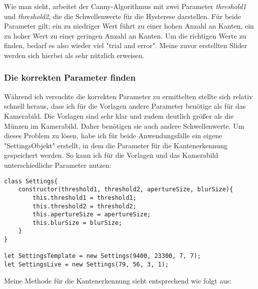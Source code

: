 Wie man sieht, arbeitet der Canny-Algorithmus mit zwei Parameter \textit{threshold1} und \textit{threshold2}, die die Schwellenwerte für die Hysterese darstellen. Für beide Parameter gilt: ein zu niedriger Wert führt zu einer hohen Anzahl an Kanten, ein zu hoher Wert zu einer geringen Anzahl an Kanten. Um die richtigen Werte zu finden, bedarf es also wieder viel "trial and error". Meine zuvor erstellten Slider werden sich hierbei als sehr nützlich erweisen.
\subsubsection{Die korrekten Parameter finden}
Während ich versuchte die korrekten Parameter zu ermittelten stellte sich relativ schnell heraus, dass ich für die Vorlagen andere Parameter benötige als für das Kamerabild. Die Vorlagen sind sehr klar und zudem deutlich größer als die Münzen im Kamerabild. Daher benötigen sie auch andere Schwellenwerte. Um dieses Problem zu lösen, habe ich für beide Anwendungsfälle ein eigene "SettingsObjekt" erstellt, in dem die Parameter für die Kantenerkennung gespeichert werden. So kann ich für die Vorlagen und das Kamerabild unterschiedliche Parameter nutzen:

\begin{lstlisting}[style=JavaScript]
class Settings{
    constructor(threshold1, threshold2, apertureSize, blurSize){
        this.threshold1 = threshold1;
        this.threshold2 = threshold2;
        this.apertureSize = apertureSize;
        this.blurSize = blurSize;
    }
}

let SettingsTemplate = new Settings(9400, 23300, 7, 7);
let SettingsLive = new Settings(79, 56, 3, 1);
\end{lstlisting}

Meine Methode für die Kantenerkennung sieht entsprechend wie folgt aus:

